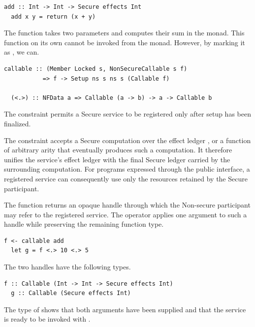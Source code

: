 \documentclass[sigconf]{acmart}
\begin{document}
\begin{lstlisting}[style=haskell]
  add :: Int -> Int -> Secure effects Int
  add x y = return (x + y)
\end{lstlisting}

The function  takes two parameters and computes their sum in the  monad.
This function on its own cannot be invoked from the  monad.
However, by marking it as , we can.

\begin{lstlisting}[style=haskell]
  callable :: (Member Locked s, NonSecureCallable s f)
           => f -> Setup ns s ns s (Callable f)

  (<.>) :: NFData a => Callable (a -> b) -> a -> Callable b
\end{lstlisting}

The  constraint permits a Secure service to be registered only after setup has been finalized.

The  constraint accepts a Secure computation over the effect ledger , or a function of arbitrary arity that eventually produces such a computation.
It therefore unifies the service's effect ledger with the final Secure ledger carried by the surrounding  computation.
For programs expressed through the public interface, a registered service can consequently use only the resources retained by the Secure participant.

The  function returns an opaque  handle through which the Non-secure participant may refer to the registered service.
The  operator applies one argument to such a handle while preserving the remaining function type.

\begin{lstlisting}[style=haskell]
  f <- callable add
  let g = f <.> 10 <.> 5
\end{lstlisting}

The two handles have the following types.

\begin{lstlisting}[style=haskell]
  f :: Callable (Int -> Int -> Secure effects Int)
  g :: Callable (Secure effects Int)
\end{lstlisting}

The type of  shows that both arguments have been supplied and that the service is ready to be invoked with .
\end{document}
